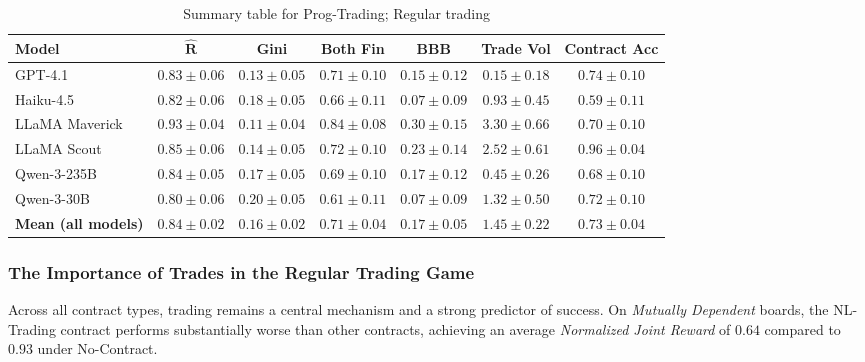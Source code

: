 \documentclass{article} %
\newcommand{\PTC}{Prog-Trading\xspace}
\newcommand{\NLTC}{NL-Trading\xspace}
\newcommand{\GPT}{GPT-4.1\xspace}
\newcommand{\Haiku}{Haiku-4.5\xspace}
\newcommand{\Maverick}{LLaMA Maverick\xspace}
\newcommand{\Scout}{LLaMA Scout\xspace}
\newcommand{\Qttf}{Qwen-3-235B\xspace}
\newcommand{\Qthirty}{Qwen-3-30B\xspace}
\begin{document}
\begin{table}[t]
\centering
\begin{small}
\begin{tabular}{lcccccc}
\toprule
\textbf{Model}
& \textbf{$\mathbf{\hat{R}}$}
& \textbf{Gini}
& \textbf{Both Fin}
& \textbf{BBB}
& \textbf{Trade Vol}
& \textbf{Contract Acc}
\\
\midrule
\GPT
& $0.83 \pm 0.06$
& $0.13 \pm 0.05$
& $0.71 \pm 0.10$
& $0.15 \pm 0.12$
& $0.15 \pm 0.18$
& $0.74 \pm 0.10$
\\

\Haiku
& $0.82 \pm 0.06$
& $0.18 \pm 0.05$
& $0.66 \pm 0.11$
& $0.07 \pm 0.09$
& $0.93 \pm 0.45$
& $0.59 \pm 0.11$
\\

\Maverick
& $0.93 \pm 0.04$
& $0.11 \pm 0.04$
& $0.84 \pm 0.08$
& $0.30 \pm 0.15$
& $3.30 \pm 0.66$
& $0.70 \pm 0.10$
\\

\Scout
& $0.85 \pm 0.06$
& $0.14 \pm 0.05$
& $0.72 \pm 0.10$
& $0.23 \pm 0.14$
& $2.52 \pm 0.61$
& $0.96 \pm 0.04$
\\

\Qttf
& $0.84 \pm 0.05$
& $0.17 \pm 0.05$
& $0.69 \pm 0.10$
& $0.17 \pm 0.12$
& $0.45 \pm 0.26$
& $0.68 \pm 0.10$
\\

\Qthirty
& $0.80 \pm 0.06$
& $0.20 \pm 0.05$
& $0.61 \pm 0.11$
& $0.07 \pm 0.09$
& $1.32 \pm 0.50$
& $0.72 \pm 0.10$
\\

\midrule
\textbf{Mean (all models)}
& $\mathbf{0.84 \pm 0.02}$
& $\mathbf{0.16 \pm 0.02}$
& $\mathbf{0.71 \pm 0.04}$
& $\mathbf{0.17 \pm 0.05}$
& $\mathbf{1.45 \pm 0.22}$
& $\mathbf{0.73 \pm 0.04}$
\\
\bottomrule
\end{tabular}
\end{small}
\caption{Summary table for \PTC; Regular trading}
\label{tab:}
\end{table}


\FloatBarrier

\subsubsection{The Importance of Trades in the Regular Trading Game}

Across all contract types, trading remains a central mechanism and a strong predictor of success. On \textit{Mutually Dependent} boards, the \NLTC contract performs substantially worse than other contracts, achieving an average \textit{Normalized Joint Reward} of $0.64$ compared to $0.93$ under No-Contract.
\end{document}
